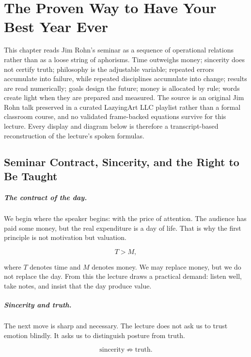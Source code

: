\chapter{The Proven Way to Have Your Best Year Ever}

This chapter reads Jim Rohn's seminar as a sequence of operational relations rather than as a loose string of aphorisms. Time outweighs money; sincerity does not certify truth; philosophy is the adjustable variable; repeated errors accumulate into failure, while repeated disciplines accumulate into change; results are read numerically; goals design the future; money is allocated by rule; words create light when they are prepared and measured. The source is an original Jim Rohn talk preserved in a curated LazyingArt LLC playlist rather than a formal classroom course, and no validated frame-backed equations survive for this lecture. Every display and diagram below is therefore a transcript-based reconstruction of the lecture's spoken formulas.

\section{Seminar Contract, Sincerity, and the Right to Be Taught}

\paragraph{The contract of the day.}
We begin where the speaker begins: with the price of attention. The audience has paid some money, but the real expenditure is a day of life. That is why the first principle is not motivation but valuation.

\begin{equation}
T > M,
\end{equation}

where \(T\) denotes time and \(M\) denotes money. We may replace money, but we do not replace the day. From this the lecture draws a practical demand: listen well, take notes, and insist that the day produce value.

\paragraph{Sincerity and truth.}
The next move is sharp and necessary. The lecture does not ask us to trust emotion blindly. It asks us to distinguish posture from truth.

\begin{equation}
\text{sincerity} \not\Rightarrow \text{truth}.
\end{equation}

